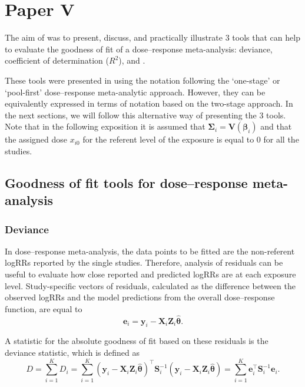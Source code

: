 %

\section{Paper V}

The aim of  was to present, discuss, and practically illustrate 3 tools that can help to evaluate the goodness of fit of a dose--response meta-analysis: deviance, coefficient of determination ($R^2$), and \rveplot.

These tools were presented in   using the notation following the `one-stage' or `pool-first' dose--response meta-analytic approach. However, they can be equivalently expressed in terms of notation based on the two-stage approach.  In the next sections, we will follow this alternative way of presenting the 3 tools. Note that in the following exposition it is assumed that $\boldsymbol{\Sigma}_i = \mathbf{V}(\boldsymbol{\beta}_i)$ and that the assigned dose $x_{i0}$ for the referent level of the exposure  is equal to 0 for all the studies.

\subsection{Goodness of fit tools for dose--response meta-analysis}
\subsubsection{Deviance}

In dose--response meta-analysis, the data points to be fitted are the non-referent logRRs reported by the single studies. Therefore, analysis of  residuals can be useful to evaluate how close reported and predicted logRRs are at each exposure level. Study-specific vectors of residuals, calculated as the difference between the observed logRRs and the model predictions from the overall dose--response function, are equal to
\begin{equation*}
\mathbf{e}_i = \mathbf{y}_i - \mathbf{X}_i \mathbf{Z}_i \hat{\boldsymbol{\theta}}.
\end{equation*}

A statistic for the absolute goodness of fit based on these residuals is the deviance statistic, which is defined as
\begin{equation}
D = \sum_{i=1}^{K} D_i = \sum_{i=1}^{K} \left(\mathbf{y}_i - \mathbf{X}_i \mathbf{Z}_i \hat{\boldsymbol{\theta}}\right)^\top \mathbf{S}_i^{-1} \left(\mathbf{y}_i - \mathbf{X}_i \mathbf{Z}_i \hat{\boldsymbol{\theta}}\right) = \sum_{i=1}^{K} \mathbf{e}_i^\top \mathbf{S}_i^{-1} \mathbf{e}_i.
\label{eq:deviance}
\end{equation}

